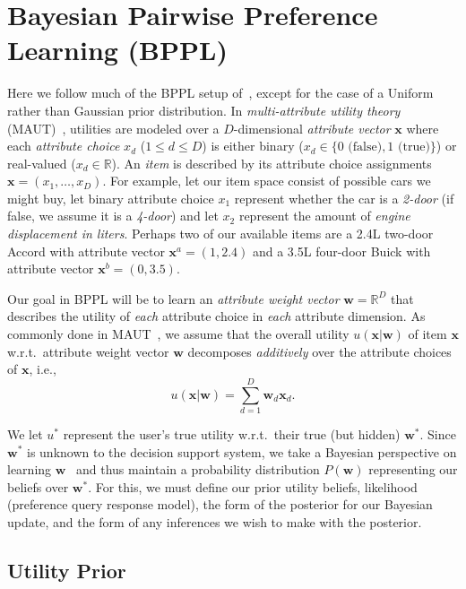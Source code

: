 \documentclass[letterpaper]{article}
\newcommand{\R}{\mathbb{R}}
\renewcommand{\vec}[1]{\mathbf{#1}}
\begin{document}
\section{Bayesian Pairwise Preference Learning (BPPL)}

Here we follow much of the BPPL setup of~\cite{sanner:aistats10},
except for the case of a Uniform rather than Gaussian prior distribution.  
In \emph{multi-attribute
utility theory} (MAUT)~\cite{keeney_raiffa76}, utilities are modeled
over a $D$-dimensional \emph{attribute vector} $\vec{x}$ where each
\emph{attribute choice} $x_d$ ($1 \leq d \leq D$) is either binary
($x_d \in \{0 \mbox{ (false)},1 \mbox{ (true)}\}$) or real-valued
($x_d \in \R$).  An \emph{item} is described by its attribute choice
assignments $\vec{x}=(x_{1},\dots,x_{D})$.  For example, let our
item space consist of possible cars we might buy, let binary attribute
choice $x_1$ represent whether the car is a \emph{2-door} (if false,
we assume it is a \emph{4-door}) and let $x_2$ represent the amount of
\emph{engine displacement in liters}.  Perhaps two of our available
items are a 2.4L two-door Accord with attribute vector $\vec{x}^a =
(1,2.4)$ and a 3.5L four-door Buick with attribute vector $\vec{x}^b =
(0,3.5)$.

Our goal in BPPL will be to learn an \emph{attribute weight vector}
$\vec{w} = \mathbb{R}^D$ that describes the utility of \emph{each}
attribute choice in \emph{each} attribute dimension.  As commonly done
in MAUT~\cite{keeney_raiffa76,bacchus_grove}, we assume that the overall 
utility $u(\vec{x}|\vec{w})$ of item $\vec{x}$ w.r.t.\ attribute
weight vector $\vec{w}$ decomposes \emph{additively} over the
attribute choices of $\vec{x}$, i.e.,
\begin{equation}\label{eq:util}
u(\vec{x}|\vec{w}) = \sum_{d=1}^{D} \vec{w}_d \vec{x}_d .
\end{equation}

We let $u^*$ represent the user's true utility w.r.t.\ their true (but
hidden) $\vec{w}^*$.  Since $\vec{w}^{*}$ is unknown to the decision
support system, we take a Bayesian perspective on learning
$\vec{w}$~\cite{Chajewska00utilitiesas} and thus maintain a
probability distribution $P(\vec{w})$ representing our beliefs over
$\vec{w}^{*}$.  For this, we must define our prior utility beliefs,
likelihood (preference query response model), the form of
the posterior for our Bayesian update, and the form of any inferences
we wish to make with the posterior.

\subsection{Utility Prior}
\end{document}
